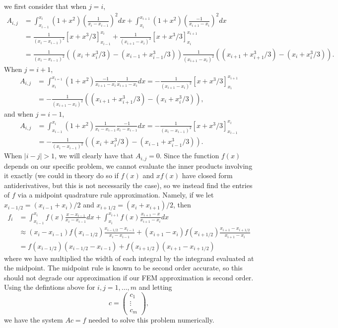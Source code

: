 \documentclass{article}
\begin{document}
we first consider that when $j=i$,
\begin{align*}
A_{i,j}&=\int_{x_{i-1}}^{x_i}(1+x^2)\left(\frac{1}{x_i-x_{i-1}}\right)^2dx+\int_{x_{i}}^{x_{i+1}}(1+x^2)\left(\frac{-1}{x_{i+1}-x_{i}}\right)^2dx\\&=
\frac{1}{(x_i-x_{i-1})^2}\left[x+x^3/3\right]_{x_{i-1}}^{x_i}+\frac{1}{(x_{i+1}-x_{i})^2}\left[x+x^3/3\right]_{x_{i}}^{x_{i+1}}\\&=
\frac{1}{(x_i-x_{i-1})^2}((x_i+x_i^3/3)-(x_{i-1}+x_{i-1}^3/3))\frac{1}{(x_{i+1}-x_{i})^2}((x_{i+1}+x_{i+1}^3/3)-(x_{i}+x_{i}^3/3)).
\end{align*}
When $j=i+1$,
\begin{align*}
A_{i,j}&=\int_{x_i}^{x_{i=1}}(1+x^2) \frac{-1}{x_{i+1}-x_{i}}\frac{1}{x_{i+1}-x_{i}}dx=-\frac{1}{(x_{i+1}-x_{i})^2}\left[x+x^3/3\right]_{x_{i}}^{x_{i+1}}\\&=
-\frac{1}{(x_{i+1}-x_{i})^2}((x_{i+1}+x_{i+1}^3/3)-(x_{i}+x_{i}^3/3)),
\end{align*}
and when $j=i-1$, 
\begin{align*}
A_{i,j}&=\int_{x_{i-1}}^{x_i}(1+x^2)\frac{1}{x_i-x_{i-1}}\frac{-1}{x_i-x_{i-1}}dx=-\frac{1}{(x_i-x_{i-1})^2}\left[x+x^3/3\right]_{x_{i-1}}^{x_i}\\&=
-\frac{1}{(x_i-x_{i-1})^2}((x_i+x_i^3/3)-(x_{i-1}+x_{i-1}^3/3)).
\end{align*}
When $|i-j|>1$, we will clearly have that $A_{i,j}=0$. Since the function $f(x)$ depends on our specific problem, we cannot evaluate the inner products involving it exactly (we could in theory do so if $f(x)$ and $xf(x)$ have closed form antiderivatives, but this is not necessarily the case), so we instead find the entries of $f$ via a midpoint quadrature rule approximation. Namely, if we let $x_{i-1/2}=(x_{i-1}+x_i)/2$ and $x_{i+1/2}=(x_i+x_{i+1})/2$, then
\begin{align*}
f_i&=\int_{x_{i-1}}^{x_i}f(x)\frac{x-{x_{i-1}}}{x_i-x_{i-1}}dx+\int_{x_i}^{x_{i+1}}f(x)\frac{x_{i+1}-x}{x_{i+1}-x_i}dx\\&\approx
(x_i-x_{i-1})f(x_{i-1/2})\frac{x_{i-1/2}-x_{i-1}}{x_i-x_{i-1}}+(x_{i+1}-x_i)f(x_{i+1/2})\frac{x_{i+1}-x_{i+1/2}}{x_{i+1}-x_i}\\&=
f(x_{i-1/2})(x_{i-1/2}-x_{i-1})+f(x_{i+1/2})(x_{i+1}-x_{i+1/2})
\end{align*}
where we have multiplied the width of each integral by the integrand evaluated at the midpoint. The midpoint rule is known to be second order accurate, so this should not degrade our approximation if our FEM approximation is second order. Using the defintions above for $i,j=1,\ldots,m$ and letting 
\[
c=\begin{pmatrix}
c_1\\
\vdots\\
c_m
\end{pmatrix},
\]
we have the system $Ac=f$ needed to solve this problem numerically. 
\end{document}
